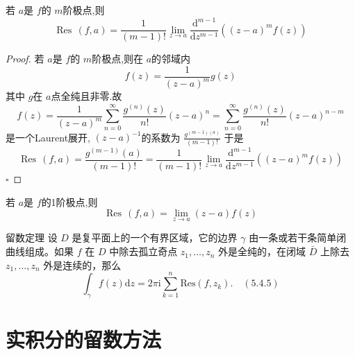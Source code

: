 \documentclass[../../复变函数.tex]{subfiles}
\begin{document}
\begin{theorem}
    若  \(  a  \)是 \(  f  \)的 \(  m  \)阶极点,则 \[
    \operatorname{Res}\,\left( f,a \right)= \frac{1 }{\left( m-1 \right)!  }\lim_{z\to a} \frac{\mathrm{d}^{m-1}}{\mathrm{d}z^{m-1}}  \left( \left( z-a \right)^{m}f\left( z \right)   \right) 
    \]   
\end{theorem}
\begin{proof}
    若 \(  a  \)是 \(  f  \)的 \(  m  \)阶极点,则在 \(  a  \)的邻域内 \[
    f\left( z \right)= \frac{1 }{\left( z-a \right)^{m}  }g\left( z \right)   
    \]   其中 \(  g  \)在 \(  a  \)点全纯且非零.故 \[
    f\left( z \right)= \frac{1 }{\left( z-a \right)^{m}  }\sum _{n = 0}^{\infty} \frac{g^{\left( n \right) }\left( z \right)  }{n! }\left( z-a \right)^{n}= \sum _{n = 0}^{\infty} \frac{g^{\left( n \right) }\left( z \right)  }{n! }\left( z-a \right)^{n-m}      
    \]   是一个Laurent展开, \(  \left( z-a \right)^{-1}   \)的系数为 \(  \frac{g^{\left( m-1 \right)\left( a \right)  } }{\left( m-1 \right)!  }   \)  
    于是 \[
    \operatorname{Res}\,\left( f,a \right)= \frac{g^{\left( m-1 \right) }\left( a \right)  }{\left( m-1 \right)!  }  = \frac{1 }{\left( m-1 \right)!  }\lim_{z\to a}\frac{\mathrm{d}^{m-1}}{\mathrm{d}z^{m-1}}\left( \left( z-a \right)^{m}f\left( z \right)   \right)  
    \]
    \hfill $\square$
\end{proof}
\begin{corollary}
    若 \(  a  \)是 \(  f  \)的1阶极点,则 \[
    \operatorname{Res}\,\left( f,a \right)= \lim_{z\to a}\left( z-a \right)f\left( z \right)   
    \]  
\end{corollary}


\begin{theorem}{留数定理}
    设 $D$ 是复平面上的一个有界区域，它的边界 $\gamma$ 由一条或若干条简单闭曲线组成。如果 $f$ 在 $D$ 中除去孤立奇点 $z_1, \dots, z_n$ 外是全纯的，在闭域 $\bar{D}$ 上除去 $z_1, \dots, z_n$ 外是连续的，那么
$$
\int_\gamma f(z) \mathrm{d} z = 2\pi \mathrm{i} \sum_{k=1}^n \mathrm{Res}(f, z_k). \quad (5.4.5)
$$
\end{theorem}

\section{实积分的留数方法}
\end{document}
